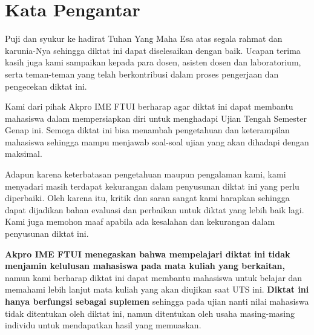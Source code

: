 \newpage
    \section{Kata Pengantar}
Puji dan syukur ke hadirat Tuhan Yang Maha Esa atas segala rahmat dan karunia-Nya sehingga diktat  ini dapat diselesaikan dengan baik. Ucapan terima kasih juga kami sampaikan kepada para dosen, asisten dosen dan laboratorium, serta teman-teman yang telah berkontribusi dalam proses pengerjaan dan pengecekan diktat ini.
\vspace{12pt}

Kami dari pihak Akpro IME FTUI berharap agar diktat  ini dapat membantu mahasiswa dalam mempersiapkan diri untuk menghadapi Ujian Tengah Semester Genap ini. Semoga diktat  ini bisa menambah pengetahuan dan keterampilan mahasiswa sehingga mampu menjawab soal-soal ujian yang akan dihadapi dengan maksimal. 
\vspace{12pt}

Adapun karena keterbatasan pengetahuan maupun pengalaman kami, kami menyadari masih terdapat kekurangan dalam penyusunan diktat ini yang perlu diperbaiki. Oleh karena itu, kritik dan saran sangat kami harapkan sehingga dapat dijadikan bahan evaluasi dan perbaikan untuk diktat yang lebih baik lagi. Kami juga memohon maaf apabila ada kesalahan dan kekurangan dalam penyusunan diktat ini.
\vspace{12pt}

\textbf{Akpro IME FTUI menegaskan bahwa mempelajari diktat ini tidak menjamin kelulusan mahasiswa pada mata kuliah yang berkaitan,} namun kami berharap diktat ini dapat membantu mahasiswa untuk belajar dan memahami lebih lanjut mata kuliah yang akan diujikan saat UTS ini. \textbf{Diktat ini hanya berfungsi sebagai suplemen} sehingga pada ujian nanti nilai mahasiswa tidak ditentukan oleh diktat ini, namun ditentukan oleh usaha masing-masing individu untuk mendapatkan hasil yang memuaskan.\\
